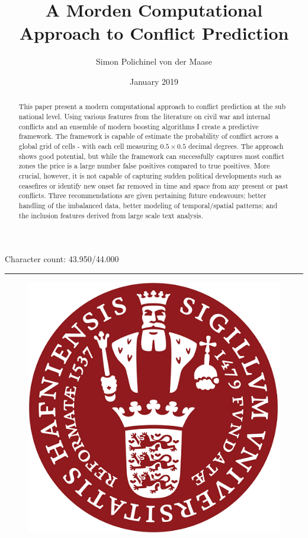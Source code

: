\documentclass[a4paper]{article}
\title{A Morden Computational Approach to Conflict Prediction}
\author{Simon Polichinel von der Maase}
\date{January 2019}
\begin{document}
	\begin{titlepage}
		\maketitle
		Character count: 43.950/44.000\\
		\noindent\rule{\linewidth}{0.4pt}
		\begin{figure}[h]
			\centering
			\includegraphics[scale=0.32]{KU_logo.png}
		\end{figure}
		\thispagestyle{empty} %
	\end{titlepage}
    \tableofcontents
\pagebreak

\begin{abstract}

This paper present a modern computational approach to conflict prediction at the sub national level. Using various features from the literature on civil war and internal conflicts and an ensemble of modern boosting algorithms I create a predictive framework. The framework is capable of estimate the probability of conflict across a global grid of cells - with each cell measuring $0.5 \times 0.5$ decimal degrees. The approach shows good potential, but while the framework can successfully captures most conflict zones the price is a large number false positives compared to true positives. More crucial, however, it is not capable of capturing sudden political developments such as ceasefires or identify new onset far removed in time and space from any present or past conflicts. Three recommendations are given pertaining future endeavours; better handling of the imbalanced data, better modeling of temporal/spatial patterns; and the inclusion features derived from large scale text analysis.

\end{abstract}
\pagebreak
\end{document}
